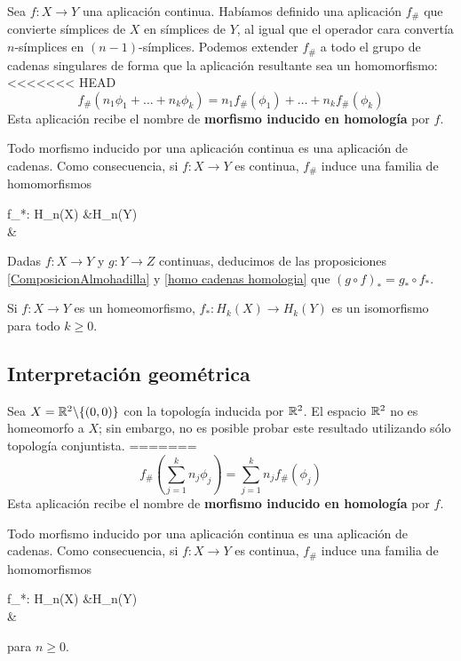\begin{proposition}
Sea $f\colon X \to Y$ una aplicación continua.
Habíamos definido una aplicación $f_\#$ que convierte símplices de $X$ en símplices de $Y$, al igual que el operador cara convertía $n$-símplices en $(n-1)$-símplices.
Podemos extender $f_\#$ a todo el grupo de cadenas singulares de forma que la aplicación resultante sea un homomorfismo:
<<<<<<< HEAD
	\[f_\#(n_1\phi_1+\dots+n_k\phi_k)=n_1f_\#(\phi_1)+\dots+n_kf_\#(\phi_k)\]
Esta aplicación recibe el nombre de \textbf{morfismo inducido en homología} por $f$.

\begin{proposition}\label{homo cadenas homologia}
	Todo morfismo inducido por una aplicación continua es una aplicación de cadenas.
	Como consecuencia, si $f\colon X \to Y$ es continua, $f_\#$ induce una familia de homomorfismos
	\begin{funcion*}
		f_*: H_n(X) \arrow[r] &H_n(Y)\\
		\left[x\right] \arrow[maps to,r]    &\left[f_\#(x)\right]
	\end{funcion*}
\end{proposition}

Dadas $f\colon X \to Y$ y $g\colon Y \to Z$ continuas, deducimos de las proposiciones \ref{ComposicionAlmohadilla} y \ref{homo cadenas homologia} que $(g\circ f)_*=g_*\circ f_*$.

\begin{theorem}
	Si $f\colon X \to Y$ es un homeomorfismo, $f_*\colon H_k(X) \to H_k(Y)$ es un isomorfismo para todo $k \geq 0$.
\end{theorem}

\subsection{Interpretación geométrica}
Sea $X=\mathbb{R}^2\backslash\{(0,0)\}$ con la topología inducida por $\mathbb{R}^2$.
El espacio $\mathbb{R}^2$ no es homeomorfo a $X$; sin embargo, no es posible probar este resultado utilizando sólo topología conjuntista.
=======
	\[f_\#\left(\sum^k_{j=1}n_j\phi_j\right)=\sum^k_{j=1}n_jf_\#(\phi_j)\]
Esta aplicación recibe el nombre de \textbf{morfismo inducido en homología} por $f$.

\begin{proposition}
	Todo morfismo inducido por una aplicación continua es una aplicación de cadenas.
	Como consecuencia, si $f\colon X \to Y$ es continua, $f_\#$ induce una familia de homomorfismos
	\begin{funcion}
		f_*: H_n(X) \arrow[r] &H_n(Y)\\
		\left[x\right] \arrow[maps to,r]    &\left[f_\#(x)\right]
	\end{funcion}
	para $n \geq 0$.
\end{proposition}


\end{proposition}
